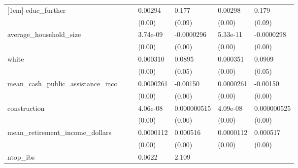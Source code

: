 {\begin{longtable}{|l|ll|ll|ll|}
            [1em]
            educ\_further&                     &                     &     0.00294\sym{*}  &       0.177\sym{*}  &     0.00298\sym{*}  &       0.179\sym{*}  \\
                        &                     &                     &      (0.00)         &      (0.09)         &      (0.00)         &      (0.09)         \\
            [1em]
            average\_household\_size&                     &                     &    3.74e-09         &  -0.0000296\sym{*}  &    5.33e-11         &  -0.0000298\sym{*}  \\
                        &                     &                     &      (0.00)         &      (0.00)         &      (0.00)         &      (0.00)         \\
            [1em]
            white       &                     &                     &    0.000310         &      0.0895         &    0.000351         &      0.0909         \\
                        &                     &                     &      (0.00)         &      (0.05)         &      (0.00)         &      (0.05)         \\
            [1em]
            mean\_cash\_public\_assistance\_inco&                     &                     &   0.0000261\sym{***}&    -0.00150\sym{***}&   0.0000261\sym{***}&    -0.00150\sym{***}\\
                        &                     &                     &      (0.00)         &      (0.00)         &      (0.00)         &      (0.00)         \\
            [1em]
            construction&                     &                     &    4.06e-08\sym{**} & 0.000000515         &    4.09e-08\sym{**} & 0.000000525         \\
                        &                     &                     &      (0.00)         &      (0.00)         &      (0.00)         &      (0.00)         \\
            [1em]
            mean\_retirement\_income\_dollars&                     &                     &   0.0000112\sym{***}&    0.000516\sym{***}&   0.0000112\sym{***}&    0.000517\sym{***}\\
                        &                     &                     &      (0.00)         &      (0.00)         &      (0.00)         &      (0.00)         \\
            [1em]
            ntop\_ibs    &                     &                     &      0.0622         &       2.109         &                     &                     \\

\end{longtable}}
